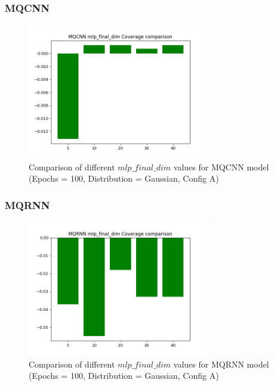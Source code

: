 \subsubsection{MQCNN} \label{comp2_mqcnn}

\begin{figure}[H]
    \centering
    \includegraphics[width=300px]{plots/hist/a/MQCNN/mlp_final_dim/Coverage.png}
    \caption{Comparison of different $mlp\_final\_dim$ values for MQCNN model (Epochs = 100, Distribution = Gaussian, Config A)}
    \label{fig:comp2_mqcnn}
\end{figure}

\subsubsection{MQRNN} \label{comp2_mqrnn}

\begin{figure}[H]
    \centering
    \includegraphics[width=300px]{plots/hist/a/MQRNN/mlp_final_dim/Coverage.png}
    \caption{Comparison of different $mlp\_final\_dim$ values for MQRNN model (Epochs = 100, Distribution = Gaussian, Config A)}
    \label{fig:comp2_mqrnn}
\end{figure}


